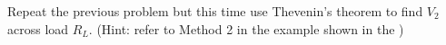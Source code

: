 
\item Repeat the previous problem but this time use Thevenin's theorem to find
$V_2$ across load $R_L$. (Hint: refer to Method 2 in the example shown in the
)

